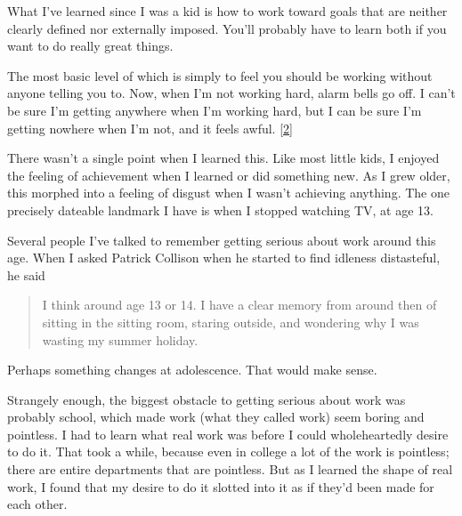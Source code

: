 What I've learned since
                  I was a kid is how to work toward goals that are neither
                  clearly defined nor externally imposed. You'll probably have
                  to learn both if you want to do really great things.

The
                  most basic level of which is simply to feel you should be
                  working without anyone telling you to. Now, when I'm not
                  working hard, alarm bells go off. I can't be sure I'm getting
                  anywhere when I'm working hard, but I can be sure I'm getting
                  nowhere when I'm not, and it feels awful.
                  [\href{\#f2n}{2}]

There wasn't a single point when I learned this.
                  Like most little kids, I enjoyed the feeling of achievement
                  when I learned or did something new. As I grew older, this
                  morphed into a feeling of disgust when I wasn't achieving
                  anything. The one precisely dateable landmark I have is when I
                  stopped watching TV, at age 13.

Several people
                  I've talked to remember getting serious about work around this
                  age. When I asked Patrick Collison when he started to find
                  idleness distasteful, he said
                  \begin{quote}

                    I think around age 13 or 14. I have a clear memory from
                    around then of sitting in the sitting room, staring outside,
                    and wondering why I was wasting my summer holiday.
                  
\end{quote}

                  Perhaps something changes at adolescence. That would make
                  sense.

Strangely enough, the biggest obstacle to
                  getting serious about work was probably school, which made
                  work (what they called work) seem boring and pointless. I had
                  to learn what real work was before I could wholeheartedly
                  desire to do it. That took a while, because even in college a
                  lot of the work is pointless; there are entire departments
                  that are pointless. But as I learned the shape of real work, I
                  found that my desire to do it slotted into it as if they'd
                  been made for each other.

